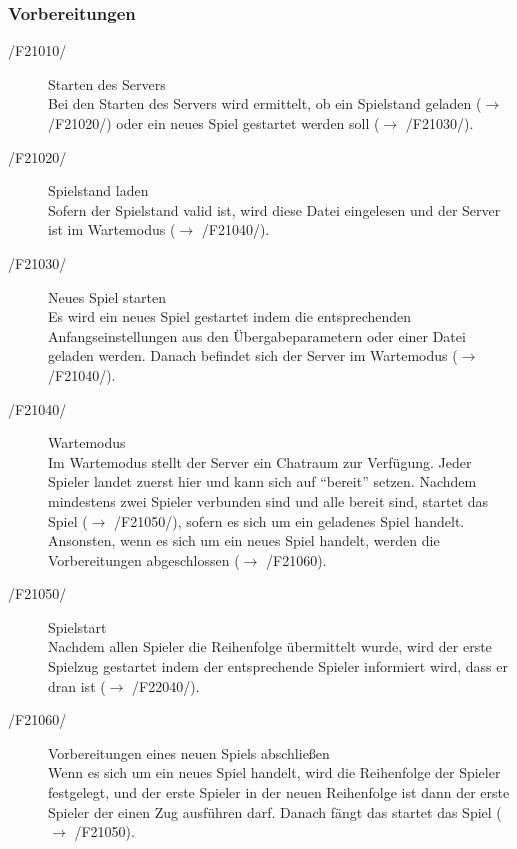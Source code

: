 \documentclass[a4paper,10pt]{article}
\begin{document}
\subsubsection{Vorbereitungen}
\begin{description}
\item[/F21010/] Starten des Servers \\
Bei den Starten des Servers wird ermittelt, ob ein Spielstand geladen ($\rightarrow$ /F21020/) oder ein neues Spiel gestartet werden soll ($\rightarrow$ /F21030/).
\item[/F21020/] Spielstand laden \\
Sofern der Spielstand valid ist, wird diese Datei eingelesen und der Server ist im Wartemodus ($\rightarrow$ /F21040/).
\item[/F21030/] Neues Spiel starten \\
Es wird ein neues Spiel gestartet indem die entsprechenden Anfangseinstellungen aus den Übergabeparametern oder einer Datei geladen werden. Danach befindet sich der Server im Wartemodus ($\rightarrow$ /F21040/).
\item[/F21040/] Wartemodus \\
Im Wartemodus stellt der Server ein Chatraum zur Verfügung. Jeder Spieler landet zuerst hier und kann sich auf "`bereit"' setzen. Nachdem mindestens zwei Spieler verbunden sind und alle bereit sind, startet das Spiel ($\rightarrow$ /F21050/), sofern es sich um ein geladenes Spiel handelt. Ansonsten, wenn es sich um ein neues Spiel handelt, werden die Vorbereitungen abgeschlossen ($\rightarrow$ /F21060).
\item[/F21050/] Spielstart \\
Nachdem allen Spieler die Reihenfolge übermittelt wurde, wird der erste Spielzug gestartet indem der entsprechende Spieler informiert wird, dass er dran ist ($\rightarrow$ /F22040/).
\item[/F21060/] Vorbereitungen eines neuen Spiels abschließen \\
Wenn es sich um ein neues Spiel handelt, wird die Reihenfolge der Spieler festgelegt, und der erste Spieler in der neuen Reihenfolge ist dann der erste Spieler der einen Zug ausführen darf. Danach fängt das startet das Spiel ($\rightarrow$ /F21050).
\end{description}
\end{document}
